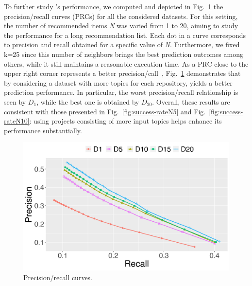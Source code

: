
To further study \TF's performance, we computed and depicted in Fig.~\ref{fig:configs} the precision/recall curves (PRCs) for all the considered datasets. 
For this setting, the number of recommended items \emph{N} was varied from 1 to 20, aiming to study the performance for a long recommendation list. Each dot in a curve corresponds to precision and recall obtained for a specific value of \emph{N}. Furthermore, we fixed k=25 since this number of neighbors brings the best prediction outcomes among others, while it still maintains a reasonable execution time. As a PRC close to the upper right corner represents a better precision/call~\cite{NGUYEN2020110460}, Fig.~\ref{fig:configs} demonstrates that by considering a dataset with more topics for each repository, \TFa yields a better prediction performance. In particular, the worst precision/recall relationship is seen by $D_{1}$, while the best one is obtained by $D_{20}$. Overall, these results are consistent with those presented in Fig.~\ref{fig:success-rateN5} and Fig.~\ref{fig:success-rateN10}: using projects consisting of more input topics helps \TFa enhance its performance substantially.

\begin{figure}[b!]
	\centering
	\includegraphics[width=0.90\linewidth]{figs/PrecisionRecallCurve.png}
	\caption{Precision/recall curves.}%
	\label{fig:configs}
\end{figure}

